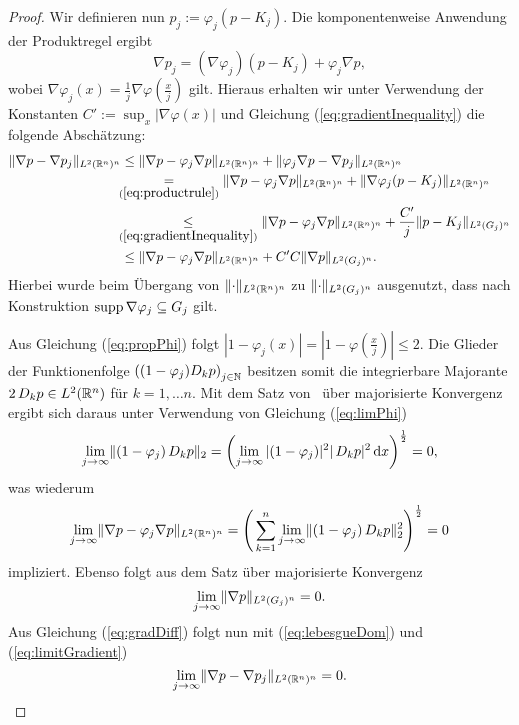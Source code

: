 \begin{proof}
  Wir definieren nun $p_j := \varphi_j (p - K_j)$.
  Die komponentenweise Anwendung der Produktregel ergibt 
  \begin{equation}
    \label{eq:productrule}
    \nabla p_j =  (\nabla \varphi_j)(p - K_j) + \varphi_j \nabla p,
  \end{equation}
  wobei $\nabla \varphi_j(x) = \frac{1}{j} \nabla \varphi (\frac{x}{j})$ gilt.
  Hieraus erhalten wir unter Verwendung der Konstanten $C' := \sup_x |\nabla \varphi(x)|$ und Gleichung (\ref{eq:gradientInequality}) die folgende Abschätzung:
  \begin{align}
    \norm{\nabla p - \nabla p_j}_{L^2(\R^n)^n}
    &\leq \norm{\nabla p - \varphi_j \nabla p}_{L^2(\R^n)^n} + \norm{\varphi_j \nabla p - \nabla p_j}_{L^2(\R^n)^n} \nonumber\\
    &\hspace{-0.15cm}\underset{(\ref{eq:productrule})}{=} \norm{\nabla p - \varphi_j \nabla p}_{L^2(\R^n)^n}    + \norm{\nabla\varphi_j (p - K_j)}_{L^2(\R^n)^n} \nonumber\\
    &\hspace{-0.15cm}\underset{(\ref{eq:gradientInequality})} \leq \norm{\nabla p - \varphi_j \nabla p}_{L^2(\R^n)^n} + \frac{C'}{j} \norm{p - K_j}_{L^2(G_j)^n}\nonumber\\
    &\leq \norm{\nabla p - \varphi_j \nabla p}_{L^2(\R^n)^n} + C'C \norm{\nabla p}_{L^2(G_j)^n} \label{eq:gradDiff}.
  \end{align}
  Hierbei wurde beim Übergang von $\lVert \cdot \rVert_{L^2(\mathbb{R}^n)^n}$ zu $\lVert \cdot \rVert_{L^2(G_j)^n}$ ausgenutzt, dass nach Konstruktion $\operatorname{supp} \nabla \varphi_j \subseteq G_j$ gilt.

  Aus Gleichung (\ref{eq:propPhi}) folgt $|1 - \varphi_j(x)| = |1 - \varphi(\tfrac{x}{j})| \leq 2$. 
  Die Glieder der Funktionenfolge $\left((1 - \varphi_j) D_k p\right)_{j \in \mathbb{N}}$ besitzen somit die integrierbare Majorante $2\, D_k p \in L^2(\mathbb{R}^n)$ für $k = 1, \dots n$.
  Mit dem Satz von \lebesgue\ über majorisierte Konvergenz ergibt sich daraus unter Verwendung von Gleichung (\ref{eq:limPhi})
  $$
  \lim_{j \to \infty} \lVert (1 - \varphi_j) \,D_k p \rVert_2 
  = \left( \lim_{j \to \infty} |(1 - \varphi_j)|^2 |\,D_k p|^2 \, {\operatorname{d}\!{x}} \right)^{\frac{1}{2}}
  = 0,
  $$
  was wiederum
  \begin{equation}
    \label{eq:lebesgueDom}
  \lim_{j \to \infty} \lVert \nabla p - \varphi_j \nabla p \rVert_{L^2(\mathbb{R}^n)^n}
  = \left(\, \sum_{k = 1}^n \lim_{j \to \infty} \lVert (1 - \varphi_j)\, D_k p \rVert_2^2  \right)^\frac{1}{2} = 0
  \end{equation}
  impliziert.
  Ebenso folgt aus dem Satz über majorisierte Konvergenz 
  \begin{equation}
    \label{eq:limitGradient}
  \lim_{j \to \infty} \lVert \nabla p \rVert_{L^2(G_j)^n}
  = 0.
  \end{equation}
  Aus Gleichung (\ref{eq:gradDiff}) folgt nun mit (\ref{eq:lebesgueDom}) und (\ref{eq:limitGradient})
  \begin{equation}
    \label{eq:limNablaP}
    \lim_{j \to \infty} \lVert \nabla p - \nabla p_j \rVert_{L^2(\mathbb{R}^n)^n} = 0.
  \end{equation}


\end{proof}
